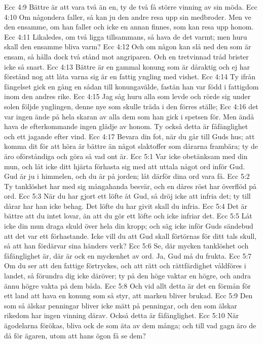 Ecc 4:9  Bättre är att vara två än en, ty de två få större vinning av sin möda.
Ecc 4:10  Om någondera faller, så kan ju den andre resa upp sin medbroder. Men ve den ensamme, om han faller och icke en annan finnes, som kan resa upp honom.
Ecc 4:11  Likaledes, om två ligga tillsammans, så hava de det varmt; men huru skall den ensamme bliva varm?
Ecc 4:12  Och om någon kan slå ned den som är ensam, så hålla dock två stånd mot angriparen. Och en tretvinnad tråd brister icke så snart.
Ecc 4:13  Bättre är en gammal konung som är dåraktig och ej har förstånd nog att låta varna sig är en fattig yngling med vishet.
Ecc 4:14  Ty ifrån fängelset gick en gång en sådan till konungavälde, fastän han var född i fattigdom inom den andres rike.
Ecc 4:15  Jag såg huru alla som levde och rörde sig under solen följde ynglingen, denne nye som skulle träda i den förres ställe;
Ecc 4:16  det var ingen ände på hela skaran av alla dem som han gick i spetsen för. Men ändå hava de efterkommande ingen glädje av honom. Ty också detta är fåfänglighet och ett jagande efter vind.
Ecc 4:17  Bevara din fot, när du går till Guds hus; att komma dit för att höra är bättre än något slaktoffer som dårarna frambära; ty de äro oförståndiga och göra så vad ont är.
Ecc 5:1  Var icke obetänksam med din mun, och låt icke ditt hjärta förhasta sig med att uttala något ord inför Gud. Gud är ju i himmelen, och du är på jorden; låt därför dina ord vara få.
Ecc 5:2  Ty tanklöshet har med sig mångahanda besvär, och en dåres röst har överflöd på ord.
Ecc 5:3  När du har gjort ett löfte åt Gud, så dröj icke att infria det; ty till dårar har han icke behag. Det löfte du har givit skall du infria.
Ecc 5:4  Det är bättre att du intet lovar, än att du gör ett löfte och icke infriar det.
Ecc 5:5  Låt icke din mun draga skuld över hela din kropp; och säg icke inför Guds sändebud att det var ett förhastande. Icke vill du att Gud skall förtörnas för ditt tals skull, så att han fördärvar sina händers verk?
Ecc 5:6  Se, där mycken tanklöshet och fåfänglighet är, där är ock en myckenhet av ord. Ja, Gud må du frukta.
Ecc 5:7  Om du ser att den fattige förtryckes, och att rätt och rättfärdighet våldföres i landet, så förundra dig icke däröver; ty på den höge vaktar en högre, och andra ännu högre vakta på dem båda.
Ecc 5:8  Och vid allt detta är det en förmån för ett land att hava en konung som så styr, att marken bliver brukad.
Ecc 5:9  Den som så älskar penningar bliver icke mätt på penningar, och den som älskar rikedom har ingen vinning därav. Också detta är fåfänglighet.
Ecc 5:10  När ägodelarna förökas, bliva ock de som äta av dem många; och till vad gagn äro de då för ägaren, utom att hans ögon få se dem?

